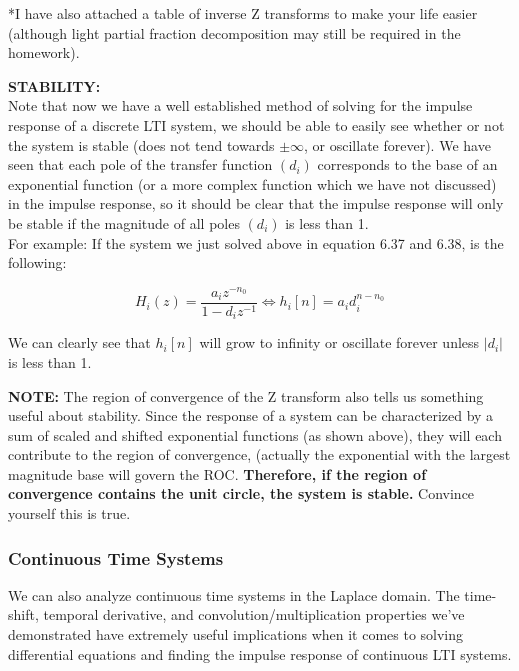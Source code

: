 \documentclass[a4paper]{article}
\numberwithin{equation}{section}
\begin{document}
*I have also attached a table of inverse Z transforms to make your life easier (although light partial fraction decomposition may still be required in the homework).

\textbf{STABILITY:}\\
Note that now we have a well established method of solving for the impulse response of a discrete LTI system, we should be able to easily see whether or not the system is stable (does not tend towards $\pm \infty$, or oscillate forever). We have seen that each pole of the transfer function $(d_i)$ corresponds to the base of an exponential function (or a more complex function which we have not discussed) in the impulse response, so it should be clear that the impulse response will only be stable if the magnitude of all poles $(d_i)$ is less than 1. \\

For example: If the system we just solved above in equation 6.37 and 6.38, is the following:

\begin{equation}
H_i(z)=\frac{a_i z^{-n_0}}{1-d_i z^{-1}}  \Longleftrightarrow h_i[n] = a_i d_i^{n-n_0}
\end{equation}

We can clearly see that $h_i[n]$ will grow to infinity or oscillate forever unless $|d_i|$ is less than 1.

\textbf{NOTE:}  The region of convergence of the Z transform also tells us something useful about stability. Since the response of a system can be characterized by a sum of scaled and shifted exponential functions (as shown above), they will each contribute to the region of convergence, (actually the exponential with the largest magnitude base will govern the ROC. \textbf{Therefore, if the region of convergence contains the unit circle, the system is stable.} Convince yourself this is true. 

\subsubsection{Continuous Time Systems}
We can also analyze continuous time systems in the Laplace domain.  The time-shift, temporal derivative, and convolution/multiplication properties we've demonstrated have extremely useful implications when it comes to solving differential equations and finding the impulse response of continuous LTI systems.
\end{document}
